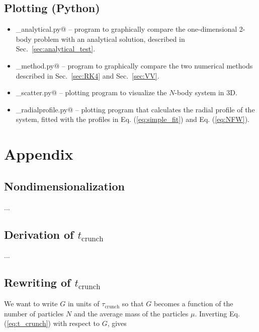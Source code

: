 \documentclass{article}
\begin{document}
\begin{multicols}{2}
\subsection{Plotting (Python)}

\begin{itemize}
	\item \verb@plotting_analytical.py@ -- program to graphically compare the one-dimensional 2-body problem with an analytical solution, described in Sec.~\ref{sec:analytical_test}.
	\item \verb@plotting_method.py@ -- program to graphically compare the two numerical methods described in Sec.~\ref{sec:RK4} and Sec.~\ref{sec:VV}.
	\item \verb@plotting_scatter.py@ -- plotting program to visualize the $N$-body system in 3D. 
	\item \verb@plotting_radialprofile.py@ -- plotting program that calculates the radial profile of the system, fitted with the profiles in Eq. (\ref{eq:simple_fit}) and Eq. (\ref{eq:NFW}).
\end{itemize}






\clearpage
\appendix
 
\section{Appendix}

\subsection{Nondimensionalization}\label{sec:nondim_deriv}

...



\subsection{Derivation of $t_{\mathrm{crunch}}$}\label{sec:t_crunch_derive}
 
...
 
\subsection{Rewriting of $t_{\mathrm{crunch}}$}\label{sec:G_derive}

We want to write $G$ in units of $\tau_{\mathrm{crunch}}$ so that $G$ becomes a function of the number of particles $N$ and the average mass of the particles $\mu$. Inverting Eq. (\ref{eq:t_crunch}) with respect to $G$, gives


\end{multicols}
\end{document}
